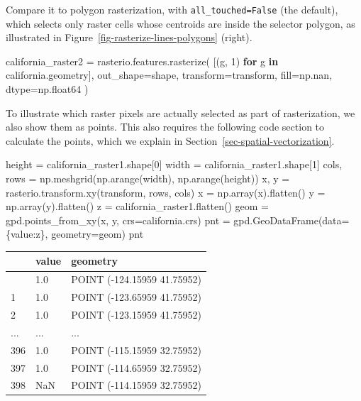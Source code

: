 \documentclass[
  letterpaper,
]{krantz}
\newenvironment{Shaded}{\begin{snugshade}}{\end{snugshade}}
\newcommand{\ControlFlowTok}[1]{\textcolor[rgb]{0.00,0.23,0.31}{\textbf{#1}}}
\newcommand{\DecValTok}[1]{\textcolor[rgb]{0.68,0.00,0.00}{#1}}
\newcommand{\KeywordTok}[1]{\textcolor[rgb]{0.00,0.23,0.31}{\textbf{#1}}}
\newcommand{\NormalTok}[1]{\textcolor[rgb]{0.00,0.23,0.31}{#1}}
\newcommand{\OperatorTok}[1]{\textcolor[rgb]{0.37,0.37,0.37}{#1}}
\newcommand{\StringTok}[1]{\textcolor[rgb]{0.13,0.47,0.30}{#1}}
\begin{document}
Compare it to polygon rasterization, with \texttt{all\_touched=False}
(the default), which selects only raster cells whose centroids are
inside the selector polygon, as illustrated in
Figure~\ref{fig-rasterize-lines-polygons} (right).

\begin{Shaded}
\begin{Highlighting}[]
\NormalTok{california\_raster2 }\OperatorTok{=}\NormalTok{ rasterio.features.rasterize(}
\NormalTok{    [(g, }\DecValTok{1}\NormalTok{) }\ControlFlowTok{for}\NormalTok{ g }\KeywordTok{in}\NormalTok{ california.geometry],}
\NormalTok{    out\_shape}\OperatorTok{=}\NormalTok{shape,}
\NormalTok{    transform}\OperatorTok{=}\NormalTok{transform,}
\NormalTok{    fill}\OperatorTok{=}\NormalTok{np.nan,}
\NormalTok{    dtype}\OperatorTok{=}\NormalTok{np.float64}
\NormalTok{)}
\end{Highlighting}
\end{Shaded}

To illustrate which raster pixels are actually selected as part of
rasterization, we also show them as points. This also requires the
following code section to calculate the points, which we explain in
Section~\ref{sec-spatial-vectorization}.

\begin{Shaded}
\begin{Highlighting}[]
\NormalTok{height }\OperatorTok{=}\NormalTok{ california\_raster1.shape[}\DecValTok{0}\NormalTok{]}
\NormalTok{width }\OperatorTok{=}\NormalTok{ california\_raster1.shape[}\DecValTok{1}\NormalTok{]}
\NormalTok{cols, rows }\OperatorTok{=}\NormalTok{ np.meshgrid(np.arange(width), np.arange(height))}
\NormalTok{x, y }\OperatorTok{=}\NormalTok{ rasterio.transform.xy(transform, rows, cols)}
\NormalTok{x }\OperatorTok{=}\NormalTok{ np.array(x).flatten()}
\NormalTok{y }\OperatorTok{=}\NormalTok{ np.array(y).flatten()}
\NormalTok{z }\OperatorTok{=}\NormalTok{ california\_raster1.flatten()}
\NormalTok{geom }\OperatorTok{=}\NormalTok{ gpd.points\_from\_xy(x, y, crs}\OperatorTok{=}\NormalTok{california.crs)}
\NormalTok{pnt }\OperatorTok{=}\NormalTok{ gpd.GeoDataFrame(data}\OperatorTok{=}\NormalTok{\{}\StringTok{\textquotesingle{}value\textquotesingle{}}\NormalTok{:z\}, geometry}\OperatorTok{=}\NormalTok{geom)}
\NormalTok{pnt}
\end{Highlighting}
\end{Shaded}

\begin{longtable}[]{@{}lll@{}}
\toprule\noalign{}
& value & geometry \\
\midrule\noalign{}
\endhead
\bottomrule\noalign{}
\endlastfoot
0 & 1.0 & POINT (-124.15959 41.75952) \\
1 & 1.0 & POINT (-123.65959 41.75952) \\
2 & 1.0 & POINT (-123.15959 41.75952) \\
... & ... & ... \\
396 & 1.0 & POINT (-115.15959 32.75952) \\
397 & 1.0 & POINT (-114.65959 32.75952) \\
398 & NaN & POINT (-114.15959 32.75952) \\
\end{longtable}
\end{document}
